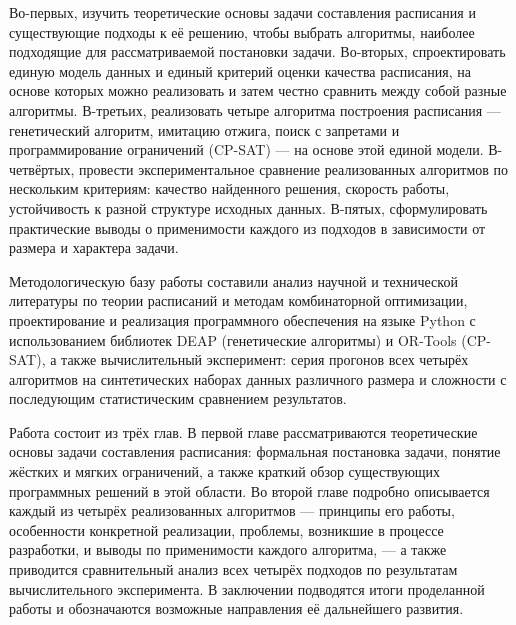 Во-первых, изучить теоретические основы задачи составления расписания и существующие подходы к её решению, чтобы выбрать алгоритмы, наиболее подходящие для рассматриваемой постановки задачи. Во-вторых, спроектировать единую модель данных и единый критерий оценки качества расписания, на основе которых можно реализовать и затем честно сравнить между собой разные алгоритмы. В-третьих, реализовать четыре алгоритма построения расписания — генетический алгоритм, имитацию отжига, поиск с запретами и программирование ограничений (CP-SAT) — на основе этой единой модели. В-четвёртых, провести экспериментальное сравнение реализованных алгоритмов по нескольким критериям: качество найденного решения, скорость работы, устойчивость к разной структуре исходных данных. В-пятых, сформулировать практические выводы о применимости каждого из подходов в зависимости от размера и характера задачи.

Методологическую базу работы составили анализ научной и технической литературы по теории расписаний и методам комбинаторной оптимизации, проектирование и реализация программного обеспечения на языке Python с использованием библиотек DEAP (генетические алгоритмы) и OR-Tools (CP-SAT), а также вычислительный эксперимент: серия прогонов всех четырёх алгоритмов на синтетических наборах данных различного размера и сложности с последующим статистическим сравнением результатов.

Работа состоит из трёх глав. В первой главе рассматриваются теоретические основы задачи составления расписания: формальная постановка задачи, понятие жёстких и мягких ограничений, а также краткий обзор существующих программных решений в этой области. Во второй главе подробно описывается каждый из четырёх реализованных алгоритмов — принципы его работы, особенности конкретной реализации, проблемы, возникшие в процессе разработки, и выводы по применимости каждого алгоритма, — а также приводится сравнительный анализ всех четырёх подходов по результатам вычислительного эксперимента. В заключении подводятся итоги проделанной работы и обозначаются возможные направления её дальнейшего развития.
